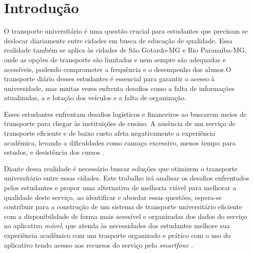 \documentclass[
    12pt,                   %
    openright,              %
    oneside,                %
    a4paper,                %
    sumario=tradicional,    %
    english,                %
    brazil,                 %
    ]{abntex2}
\begin{document}


\tableofcontents*
\cleardoublepage

\textual

\chapter{Introdução}\label{sec:introducao}
     
    O transporte universitário é uma questão crucial para estudantes que precisam se deslocar diariamente entre cidades em busca de educação de qualidade. Essa realidade também se aplica às cidades de São Gotardo-MG e Rio Paranaíba-MG, onde as opções de transporte são limitadas e nem sempre são adequadas e acessíveis, podendo comprometer a frequência e o desempenho dos alunos.O transporte diário desses estudantes é essencial para garantir o acesso à universidade, mas muitas vezes enfrenta desafios como a falta de informações atualizadas, a e lotação dos veículos e a falta de organização.

    Esses estudantes enfrentam desafios logísticos e financeiros ao buscarem meios de transporte para chegar às instituições de ensino. A ausência de um serviço de transporte eficiente e de baixo custo afeta negativamente a experiência acadêmica, levando a dificuldades como cansaço excessivo, menos tempo para estudos, e desistência dos cursos \cite{Souza2016}.
    
    Diante dessa realidade é necessário buscar soluções que otimizem o transporte universitário entre essas cidades. Este trabalho irá analisar os desafios enfrentados pelos estudantes e propor uma alternativa de melhoria viável para melhorar a qualidade deste serviço, ao identificar e abordar essas questões, espera-se contribuir para a construção de um sistema de transporte universitário eficiente com a disponibilidade de forma mais acessível e organizadas dos dados do serviço no aplicativo \textit{móvel}, que atenda às necessidades dos estudantes melhore sua experiência acadêmico com um trasporte organizado e prático com o uso do aplicativo tendo acesso aos recursos do serviço pelo \textit{smartfone} \cite{freitas2020transporte}.
    
\end{document}
